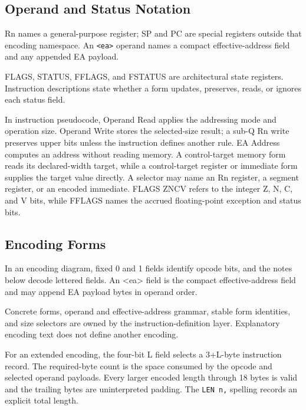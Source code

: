 \subsection*{Operand and Status Notation}
Rn names a general-purpose register; SP and PC are special registers outside that encoding namespace. An
\texttt{<ea>} operand names a compact effective-address field and any appended EA payload.

FLAGS, STATUS, FFLAGS, and FSTATUS are architectural state registers. Instruction descriptions state whether a
form updates, preserves, reads, or ignores each status field.

In instruction pseudocode, Operand Read applies the addressing mode and operation size. Operand Write stores the
selected-size result; a sub-Q Rn write preserves upper bits unless the instruction defines another rule. EA Address
computes an address without reading memory. A control-target memory form reads its declared-width target, while a
control-target register or immediate form supplies the target value directly. A selector may name an Rn register, a
segment register, or an encoded immediate. FLAGS ZNCV refers to the integer Z, N, C, and V bits, while FFLAGS names
the accrued floating-point exception and status bits.

\subsection*{Encoding Forms}
In an encoding diagram, fixed 0 and 1 fields identify opcode bits, and the notes below decode lettered fields. An
<ea> field is the compact effective-address field and may append EA payload bytes in operand order.

Concrete forms, operand and effective-address grammar, stable form identities, and size selectors are owned by the
instruction-definition layer. Explanatory encoding text does not define another encoding.

For an extended encoding, the four-bit L field selects a 3+L-byte instruction record. The required-byte count is the
space consumed by the opcode and selected operand payloads. Every larger encoded length through 18 bytes is
valid and the trailing bytes are uninterpreted padding. The \texttt{LEN n,} spelling records an explicit total length.
\endgroup
\clearpage
